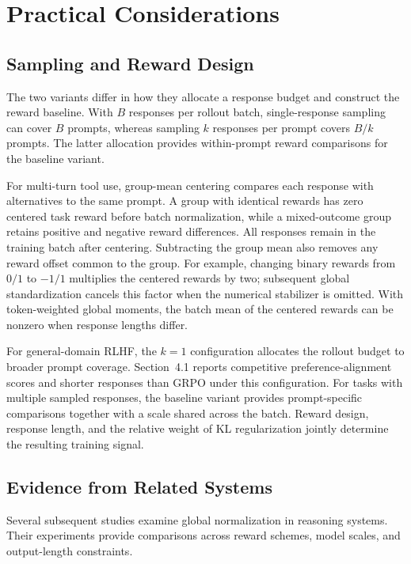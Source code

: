 \section{Practical Considerations} \label{appendix:best}

\subsection{Sampling and Reward Design}

The two variants differ in how they allocate a response budget and construct the reward baseline. With $B$ responses per rollout batch, single-response sampling can cover $B$ prompts, whereas sampling $k$ responses per prompt covers $B/k$ prompts. The latter allocation provides within-prompt reward comparisons for the baseline variant.

For multi-turn tool use, group-mean centering compares each response with alternatives to the same prompt. A group with identical rewards has zero centered task reward before batch normalization, while a mixed-outcome group retains positive and negative reward differences. All responses remain in the training batch after centering. Subtracting the group mean also removes any reward offset common to the group. For example, changing binary rewards from $0/1$ to $-1/1$ multiplies the centered rewards by two; subsequent global standardization cancels this factor when the numerical stabilizer is omitted. With token-weighted global moments, the batch mean of the centered rewards can be nonzero when response lengths differ.

For general-domain RLHF, the $k=1$ configuration allocates the rollout budget to broader prompt coverage. Section~4.1 reports competitive preference-alignment scores and shorter responses than GRPO under this configuration. For tasks with multiple sampled responses, the baseline variant provides prompt-specific comparisons together with a scale shared across the batch. Reward design, response length, and the relative weight of KL regularization jointly determine the resulting training signal.

\subsection{Evidence from Related Systems}
Several subsequent studies examine global normalization in reasoning systems. Their experiments provide comparisons across reward schemes, model scales, and output-length constraints.

